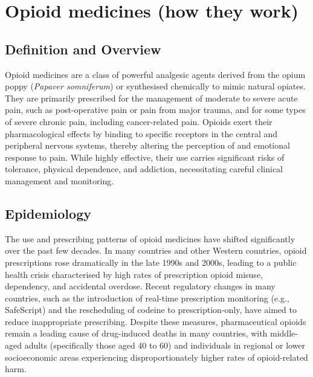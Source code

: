 \chapter{Opioid medicines (how they work)}

\section*{Definition and Overview}
Opioid medicines are a class of powerful analgesic agents derived from the opium poppy (\textit{Papaver somniferum}) or synthesised chemically to mimic natural opiates. They are primarily prescribed for the management of moderate to severe acute pain, such as post-operative pain or pain from major trauma, and for some types of severe chronic pain, including cancer-related pain. Opioids exert their pharmacological effects by binding to specific receptors in the central and peripheral nervous systems, thereby altering the perception of and emotional response to pain. While highly effective, their use carries significant risks of tolerance, physical dependence, and addiction, necessitating careful clinical management and monitoring.

\section*{Epidemiology}
The use and prescribing patterns of opioid medicines have shifted significantly over the past few decades. In many countries and other Western countries, opioid prescriptions rose dramatically in the late 1990s and 2000s, leading to a public health crisis characterised by high rates of prescription opioid misuse, dependency, and accidental overdose. Recent regulatory changes in many countries, such as the introduction of real-time prescription monitoring (e.g., SafeScript) and the rescheduling of codeine to prescription-only, have aimed to reduce inappropriate prescribing. Despite these measures, pharmaceutical opioids remain a leading cause of drug-induced deaths in many countries, with middle-aged adults (specifically those aged 40 to 60) and individuals in regional or lower socioeconomic areas experiencing disproportionately higher rates of opioid-related harm.

